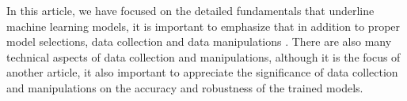 
\par
In this article, we have focused on the detailed fundamentals that underline machine learning models, it is important to emphasize that in addition to proper model selections, data collection and data manipulations . There are also many technical aspects of data collection and manipulations, although it is the focus of another article, it also important to appreciate the significance of data collection and manipulations on the accuracy and robustness of the trained models.
\par 
